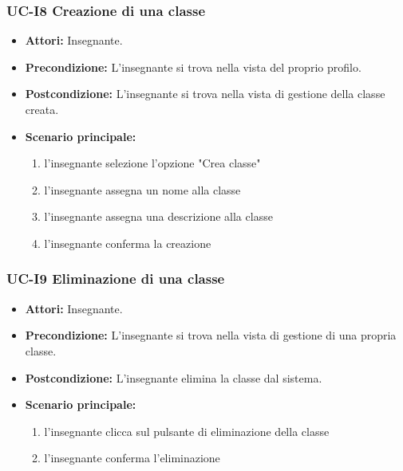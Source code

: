 \subsubsection{UC-I8 Creazione di una classe}
\begin{itemize}
	\item \textbf{Attori:} Insegnante.
	\item \textbf{Precondizione:} L'insegnante si trova nella vista del proprio profilo.
	\item \textbf{Postcondizione:} L'insegnante si trova nella vista di gestione della classe creata.
	\item \textbf{Scenario principale:}
	\begin{enumerate}
		\item l'insegnante selezione l'opzione "Crea classe"
		\item l'insegnante assegna un nome alla classe
		\item l'insegnante assegna una descrizione alla classe
		\item l'insegnante conferma la creazione
	\end{enumerate}
\end{itemize}

\subsubsection{UC-I9 Eliminazione di una classe}
\begin{itemize}
	\item \textbf{Attori:} Insegnante.
	\item \textbf{Precondizione:} L'insegnante si trova nella vista di gestione di una propria classe.
	\item \textbf{Postcondizione:} L'insegnante elimina la classe dal sistema.
	\item \textbf{Scenario principale:}
	\begin{enumerate}
		\item l'insegnante clicca sul pulsante di eliminazione della classe
		\item l'insegnante conferma l'eliminazione
	\end{enumerate}
\end{itemize}

